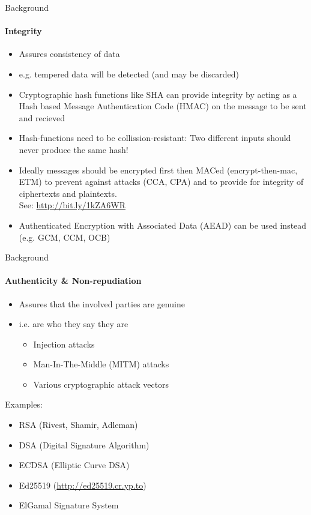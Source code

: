 \documentclass[hyperref={draft}]{beamer}
\begin{document}
\begin{frame}{Background}
  \framesubtitle{Integrity}
  \begin{itemize}
    \item Assures consistency of data
    \item e.g. tempered data will be detected (and may be discarded)
    \item Cryptographic hash functions like SHA can provide integrity by acting as a Hash based Message Authentication Code (HMAC) on the message to be sent and recieved
    \item Hash-functions need to be collission-resistant: Two different inputs should never produce the same hash!
    \item Ideally messages should be encrypted first then MACed (encrypt-then-mac, ETM) to prevent against attacks (CCA, CPA) and to provide for integrity of ciphertexts and plaintexts.\\
    See: \url{http://bit.ly/1kZA6WR}
    \item Authenticated Encryption with Associated Data (AEAD) can be used instead (e.g. GCM, CCM, OCB)
  \end{itemize}
\end{frame}

\begin{frame}{Background}
  \framesubtitle{Authenticity \& Non-repudiation}
  \begin{itemize}
    \item Assures that the involved parties are genuine
    \item i.e. are who they say they are
    \begin{itemize}
      \item Injection attacks
      \item Man-In-The-Middle (MITM) attacks
      \item Various cryptographic attack vectors
    \end{itemize}
  \end{itemize}
  Examples:
  \begin{itemize}
    \item RSA (Rivest, Shamir, Adleman)
    \item DSA (Digital Signature Algorithm)
    \item ECDSA (Elliptic Curve DSA)
    \item Ed25519 (\url{http://ed25519.cr.yp.to})
    \item ElGamal Signature System
  \end{itemize}
\end{frame}
\end{document}
